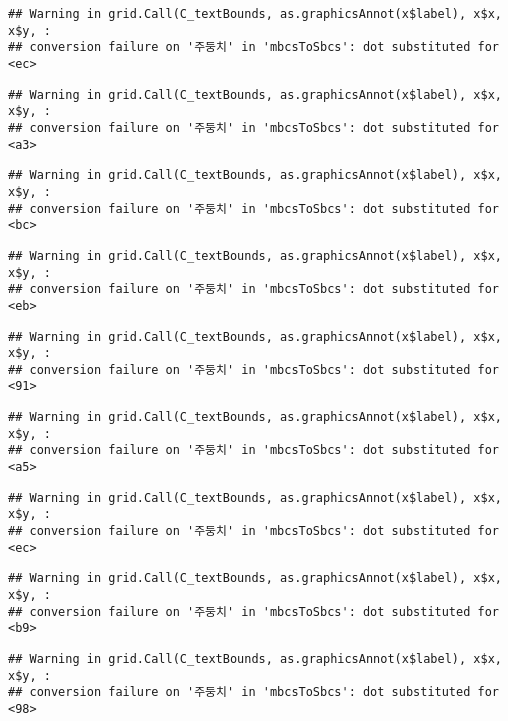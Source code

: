 \documentclass[
]{article}
\begin{document}
\begin{verbatim}
## Warning in grid.Call(C_textBounds, as.graphicsAnnot(x$label), x$x, x$y, :
## conversion failure on '주둥치' in 'mbcsToSbcs': dot substituted for <ec>
\end{verbatim}

\begin{verbatim}
## Warning in grid.Call(C_textBounds, as.graphicsAnnot(x$label), x$x, x$y, :
## conversion failure on '주둥치' in 'mbcsToSbcs': dot substituted for <a3>
\end{verbatim}

\begin{verbatim}
## Warning in grid.Call(C_textBounds, as.graphicsAnnot(x$label), x$x, x$y, :
## conversion failure on '주둥치' in 'mbcsToSbcs': dot substituted for <bc>
\end{verbatim}

\begin{verbatim}
## Warning in grid.Call(C_textBounds, as.graphicsAnnot(x$label), x$x, x$y, :
## conversion failure on '주둥치' in 'mbcsToSbcs': dot substituted for <eb>
\end{verbatim}

\begin{verbatim}
## Warning in grid.Call(C_textBounds, as.graphicsAnnot(x$label), x$x, x$y, :
## conversion failure on '주둥치' in 'mbcsToSbcs': dot substituted for <91>
\end{verbatim}

\begin{verbatim}
## Warning in grid.Call(C_textBounds, as.graphicsAnnot(x$label), x$x, x$y, :
## conversion failure on '주둥치' in 'mbcsToSbcs': dot substituted for <a5>
\end{verbatim}

\begin{verbatim}
## Warning in grid.Call(C_textBounds, as.graphicsAnnot(x$label), x$x, x$y, :
## conversion failure on '주둥치' in 'mbcsToSbcs': dot substituted for <ec>
\end{verbatim}

\begin{verbatim}
## Warning in grid.Call(C_textBounds, as.graphicsAnnot(x$label), x$x, x$y, :
## conversion failure on '주둥치' in 'mbcsToSbcs': dot substituted for <b9>
\end{verbatim}

\begin{verbatim}
## Warning in grid.Call(C_textBounds, as.graphicsAnnot(x$label), x$x, x$y, :
## conversion failure on '주둥치' in 'mbcsToSbcs': dot substituted for <98>
\end{verbatim}
\end{document}
